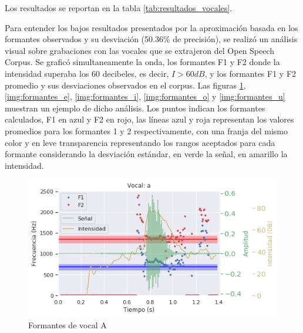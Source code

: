Los resultados se reportan en la tabla \ref{tab:resultados_vocales}.



Para entender los bajos resultados presentados por la aproximación basada en los formantes observados y su desviación (50.36\% de precisión), se realizó un análisis visual sobre grabaciones con las vocales que se extrajeron del Open Speech Corpus. Se graficó simultaneamente la onda, los formantes F1 y F2 donde la intensidad superaba los 60 decibeles, es decir, $I > 60 dB$, y los formantes F1 y F2 promedio y sus desviaciones observados en el corpus. Las figuras \ref{img:formantes_a}, \ref{img:formantes_e}, \ref{img:formantes_i}, \ref{img:formantes_o} y \ref{img:formantes_u} muestran un ejemplo de dicho análisis. Los puntos indican los formantes calculados, F1 en azul y F2 en rojo, las líneas azul y roja representan los valores promedios para los formantes 1 y 2 respectivamente, con una franja del mismo color y en leve transparencia representando los rangos aceptados para cada formante considerando la desviación estándar, en verde la señal, en amarillo la intensidad.




\begin{figure}[H]
\caption{Formantes de vocal A}
\label{img:formantes_a}
\includegraphics[width=\textwidth]{imagenes/04_02_a.png}
\end{figure}

